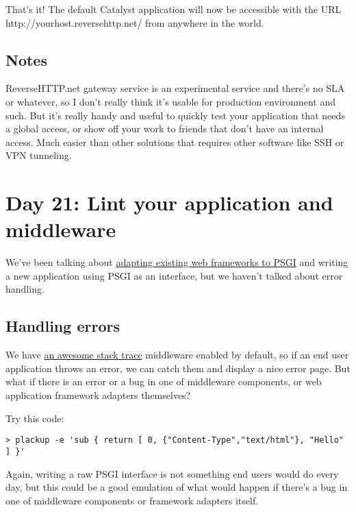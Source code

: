 That's it! The default Catalyst application will now be accessible with
the URL http://yourhost.reversehttp.net/ from anywhere in the world.

\subsection{Notes}\label{notes}

ReverseHTTP.net gateway service is an experimental service and there's
no SLA or whatever, so I don't really think it's usable for production
environment and such. But it's really handy and useful to quickly test
your application that needs a global access, or show off your work to
friends that don't have an internal access. Much easier than other
solutions that requires other software like SSH or VPN tunneling.

\section{Day 21: Lint your application and
middleware}\label{day-21-lint-your-application-and-middleware}

We've been talking about
\href{http://advent.plackperl.org/2009/12/day-8-adapting-web-frameworks-to-psgi.html}{adapting
existing web frameworks to PSGI} and writing a new application using
PSGI as an interface, but we haven't talked about error handling.

\subsection{Handling errors}\label{handling-errors}

We have
\href{http://advent.plackperl.org/2009/12/day-3-using-plackup.html}{an
awesome stack trace} middleware enabled by default, so if an end user
application throws an error, we can catch them and display a nice error
page. But what if there is an error or a bug in one of middleware
components, or web application framework adapters themselves?

Try this code:

\begin{lstlisting}
> plackup -e 'sub { return [ 0, {"Content-Type","text/html"}, "Hello" ] }'
\end{lstlisting}

Again, writing a raw PSGI interface is not something end users would do
every day, but this could be a good emulation of what would happen if
there's a bug in one of middleware components or framework adapters
itself.

